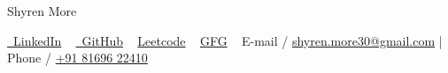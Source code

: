 \documentclass[a4,10pt]{article}
\begin{document}

\begin{flushleft}

    \begin{minipage}[b]{0.5\textwidth}
    {\Huge Shyren More} \\ 
    \end{minipage}%

    \faLinkedin \href{https://linkedin.com/in/shyrenmore/}{\raisebox{-0.2\height}\ LinkedIn} ~ 
    \faGithub \href{https://github.com/ShyrenMore}
    {\raisebox{-0.2\height}\ GitHub}  ~ 
     \href{https://leetcode.com/shyren_more/}{Leetcode}  ~ 
     \href{https://www.geeksforgeeks.org/user/shyrenmore30/?utm_source=geeksforgeeks&utm_medium=colleges&utm_campaign=users}{GFG}  ~ 
    E-mail / \href{mailto:shyren.more30@gmail.com}{shyren.more30@gmail.com} | Phone / \href{tel:8169622410}{+91 81696 22410} 
  

    
\end{flushleft}
             
             
\end{document}
